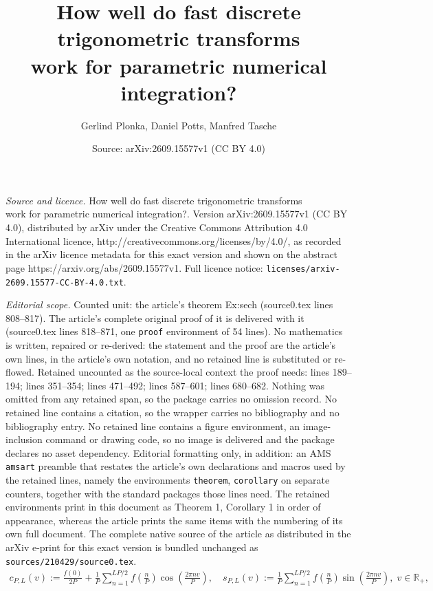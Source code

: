 \documentclass[10pt,a4paper]{amsart}
\title{How well do fast discrete trigonometric transforms\\ work for parametric numerical integration?}
\author{Gerlind Plonka, Daniel Potts, Manfred Tasche}
\date{Source: arXiv:2609.15577v1 (CC BY 4.0)}
\newcommand{\Rp}{{\mathbb R}_{+}}
\begin{document}
\maketitle

\noindent\emph{Source and licence.} How well do fast discrete trigonometric transforms\\ work for parametric numerical integration?. Version arXiv:2609.15577v1 (CC BY 4.0), distributed by arXiv under the Creative Commons Attribution 4.0 International licence, http://creativecommons.org/licenses/by/4.0/, as recorded in the arXiv licence metadata for this exact version and shown on the abstract page https://arxiv.org/abs/2609.15577v1. Full licence notice: \texttt{licenses/arxiv-2609.15577-CC-BY-4.0.txt}.\par\smallskip

\noindent\textit{Editorial scope.} Counted unit: the article's theorem Ex:sech (source0.tex lines 808--817). The article's complete original proof of it is delivered with it (source0.tex lines 818--871, one \texttt{proof} environment of 54 lines). No mathematics is written, repaired or re-derived: the statement and the proof are the article's own lines, in the article's own notation, and no retained line is substituted or re-flowed.  Retained uncounted as the source-local context the proof needs: lines 189--194; lines 351--354; lines 471--492; lines 587--601; lines 680--682.  Nothing was omitted from any retained span, so the package carries no omission record.  No retained line contains a citation, so the wrapper carries no bibliography and no bibliography entry.  No retained line contains a figure environment, an image-inclusion command or drawing code, so no image is delivered and the package declares no asset dependency.  Editorial formatting only, in addition: an AMS \texttt{amsart} preamble that restates the article's own declarations and macros used by the retained lines, namely the environments \texttt{theorem}, \texttt{corollary} on separate counters, together with the standard packages those lines need.  The retained environments print in this document as Theorem 1, Corollary 1 in order of appearance, whereas the article prints the same items with the numbering of its own full document.  The complete native source of the article as distributed in the arXiv e-print for this exact version is bundled unchanged as \texttt{sources/210429/source0.tex}.
\begin{align}\label{eq:approx}
\textstyle c_{P,L} (v) \!:= \!  \tfrac{f(0)}{2P} + \tfrac{1}{P} \sum\limits_{n=1}^{LP/2} f(\frac{n}{P})  \cos(\tfrac{2\pi n v}{P}),
\quad
s_{P,L} (v) \!:=\!  \tfrac{1}{P} \sum\limits_{n=1}^{LP/2} f(\tfrac{n}{P})  \sin(\tfrac{2\pi n v}{P}),
\; v \in \Rp,
\end{align}
\end{document}
